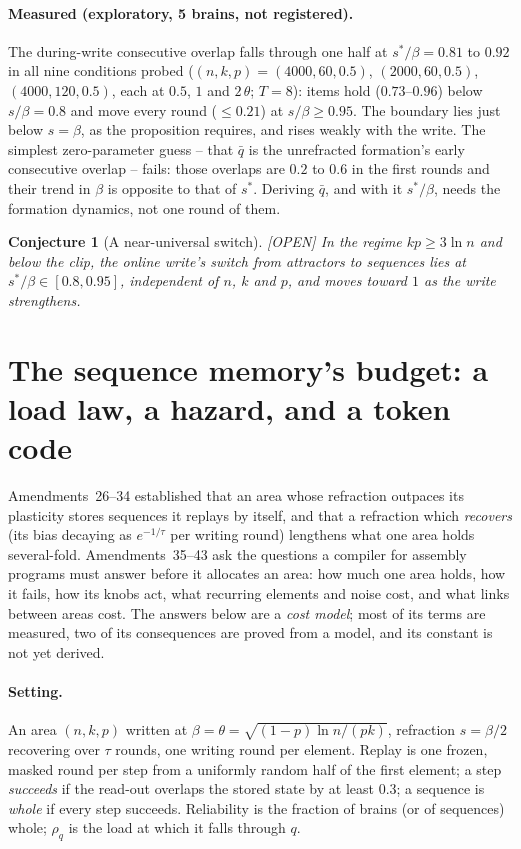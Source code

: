 \documentclass[11pt]{article}
\theoremstyle{definition}
\theoremstyle{plain}
\newtheorem{conjecture}[lemma]{Conjecture}
\newcommand{\OPEN}{\textnormal{\footnotesize\textsf{[OPEN]}}}
\begin{document}
\paragraph{Measured (exploratory, 5 brains, not registered).} The
during-write consecutive overlap falls through one half at
$s^*/\beta = 0.81$ to $0.92$ in all nine conditions probed ($(n,k,p) =
(4000,60,0.5)$, $(2000,60,0.5)$, $(4000,120,0.5)$, each at $0.5$, $1$ and
$2\,\theta$; $T = 8$): items hold ($0.73$--$0.96$) below $s/\beta = 0.8$ and
move every round ($\le 0.21$) at $s/\beta \ge 0.95$. The boundary lies just
below $s = \beta$, as the proposition requires, and rises weakly with the
write. The simplest zero-parameter guess -- that $\bar q$ is the
unrefracted formation's early consecutive overlap -- fails: those overlaps
are $0.2$ to $0.6$ in the first rounds and their trend in $\beta$ is
opposite to that of $s^*$. Deriving $\bar q$, and with it $s^*/\beta$, needs
the formation dynamics, not one round of them.

\begin{conjecture}[A near-universal switch]\label{conj:switch} \OPEN
In the regime $kp \ge 3\ln n$ and below the clip, the online write's switch
from attractors to sequences lies at $s^*/\beta \in [0.8, 0.95]$,
independent of $n$, $k$ and $p$, and moves toward $1$ as the write strengthens.
\end{conjecture}

\section{The sequence memory's budget: a load law, a hazard, and a token code}\label{sec:budget}

Amendments~26--34 established that an area whose refraction outpaces its
plasticity stores sequences it replays by itself, and that a refraction which
\emph{recovers} (its bias decaying as $e^{-1/\tau}$ per writing round) lengthens
what one area holds several-fold. Amendments~35--43 ask the questions a
compiler for assembly programs must answer before it allocates an area: how
much one area holds, how it fails, how its knobs act, what recurring elements
and noise cost, and what links between areas cost. The answers below are a
\emph{cost model}; most of its terms are measured, two of its consequences are
proved from a model, and its constant is not yet derived.

\paragraph{Setting.} An area $(n,k,p)$ written at $\beta=\theta=\sqrt{(1-p)\ln
n/(pk)}$, refraction $s = \beta/2$ recovering over $\tau$ rounds, one writing
round per element. Replay is one frozen, masked round per step from a
uniformly random half of the first element; a step \emph{succeeds} if the
read-out overlaps the stored state by at least $0.3$; a sequence is
\emph{whole} if every step succeeds. Reliability is the fraction of brains (or
of sequences) whole; $\rho_q$ is the load at which it falls through $q$.
\end{document}

